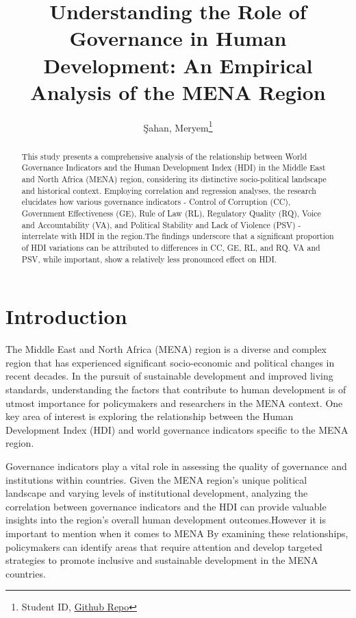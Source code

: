 \documentclass[
  12pt,
]{article}
\title{Understanding the Role of Governance in Human Development: An Empirical Analysis of the MENA Region}
\author{Şahan, Meryem\footnote{Student ID, \href{https://github.com/MeryemSahan/FinalMeryemS.git}{Github Repo}}}
\date{}
\begin{document}
\maketitle
\begin{abstract}
This study presents a comprehensive analysis of the relationship between World Governance Indicators and the Human Development Index (HDI) in the Middle East and North Africa (MENA) region, considering its distinctive socio-political landscape and historical context. Employing correlation and regression analyses, the research elucidates how various governance indicators - Control of Corruption (CC), Government Effectiveness (GE), Rule of Law (RL), Regulatory Quality (RQ), Voice and Accountability (VA), and Political Stability and Lack of Violence (PSV) - interrelate with HDI in the region.The findings underscore that a significant proportion of HDI variations can be attributed to differences in CC, GE, RL, and RQ. VA and PSV, while important, show a relatively less pronounced effect on HDI.
\end{abstract}

\hypertarget{introduction}{%
\section{Introduction}\label{introduction}}

The Middle East and North Africa (MENA) region is a diverse and complex region that has experienced significant socio-economic and political changes in recent decades. In the pursuit of sustainable development and improved living standards, understanding the factors that contribute to human development is of utmost importance for policymakers and researchers in the MENA context. One key area of interest is exploring the relationship between the Human Development Index (HDI) and world governance indicators specific to the MENA region.

Governance indicators play a vital role in assessing the quality of
governance and institutions within countries. Given the MENA region's
unique political landscape and varying levels of institutional development, analyzing the correlation between governance indicators and
the HDI can provide valuable insights into the region's overall human development outcomes.However it is important to mention when it comes to MENA
By examining these relationships, policymakers can identify areas that require attention and develop targeted strategies to promote inclusive and sustainable development in the MENA countries.
\end{document}
